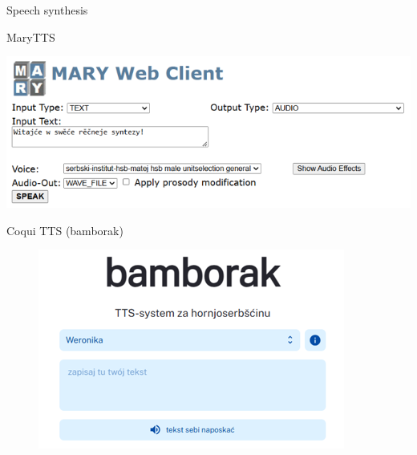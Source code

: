   \begin{block}{Speech synthesis}


    MaryTTS

    \includegraphics[width=\colwidth]{marytts_small.png}


    Coqui TTS (bamborak\cite{bamborak})

    \begin{figure}
        \centering
        \includegraphics[width=0.75\colwidth]{bamborak_small.png}
        \label{fig:bamborak}
    \end{figure}
    

  \end{block}
